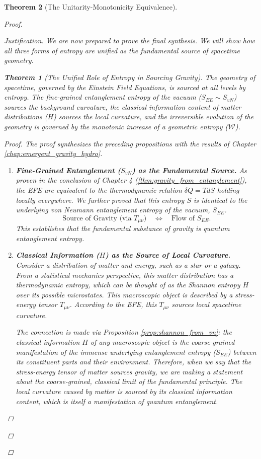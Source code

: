 \documentclass[11pt, letterpaper]{report}
\theoremstyle{plain} %
\newtheorem{theorem}{Theorem}[chapter]
\theoremstyle{definition} %
\theoremstyle{remark} %
\begin{document}
\begin{theorem}[The Unitarity-Monotonicity Equivalence]
\begin{proof}
\begin{proof}[Justification]
We are now prepared to prove the final synthesis. We will show how all three forms of entropy are unified as the fundamental source of spacetime geometry.

\begin{theorem}[The Unified Role of Entropy in Sourcing Gravity]
\label{thm:unified_entropy_source}
The geometry of spacetime, governed by the Einstein Field Equations, is sourced at all levels by entropy. The fine-grained entanglement entropy of the vacuum ($S_{EE} \sim S_{vN}$) sources the background curvature, the classical information content of matter distributions ($H$) sources the local curvature, and the irreversible evolution of the geometry is governed by the monotonic increase of a geometric entropy ($\mathcal{W}$).
\end{theorem}
\begin{proof}
The proof synthesizes the preceding propositions with the results of Chapter \ref{chap:emergent_gravity_hydro}.
\begin{enumerate}
    \item \textbf{Fine-Grained Entanglement ($S_{vN}$) as the Fundamental Source.} As proven in the conclusion of Chapter 4 (\cref{thm:gravity_from_entanglement}), the EFE are equivalent to the thermodynamic relation $\delta Q = T dS$ holding locally everywhere. We further proved that this entropy $S$ is identical to the underlying von Neumann entanglement entropy of the vacuum, $S_{EE}$.
    \begin{equation}
        \text{Source of Gravity (via } T_{\mu\nu}) \quad \Longleftrightarrow \quad \text{Flow of } S_{EE}.
    \end{equation}
    This establishes that the fundamental substance of gravity is quantum entanglement entropy.

    \item \textbf{Classical Information ($H$) as the Source of Local Curvature.} Consider a distribution of matter and energy, such as a star or a galaxy. From a statistical mechanics perspective, this matter distribution has a thermodynamic entropy, which can be thought of as the Shannon entropy $H$ over its possible microstates. This macroscopic object is described by a stress-energy tensor $T_{\mu\nu}$. According to the EFE, this $T_{\mu\nu}$ sources local spacetime curvature.
    
    The connection is made via Proposition \ref{prop:shannon_from_vn}: the classical information $H$ of any macroscopic object is the coarse-grained manifestation of the immense underlying entanglement entropy ($S_{EE}$) between its constituent parts and their environment. Therefore, when we say that the stress-energy tensor of matter sources gravity, we are making a statement about the coarse-grained, classical limit of the fundamental principle. The local curvature caused by matter is sourced by its classical information content, which is itself a manifestation of quantum entanglement.


\end{enumerate}
\end{proof}
\end{proof}
\end{proof}
\end{theorem}
\end{document}
